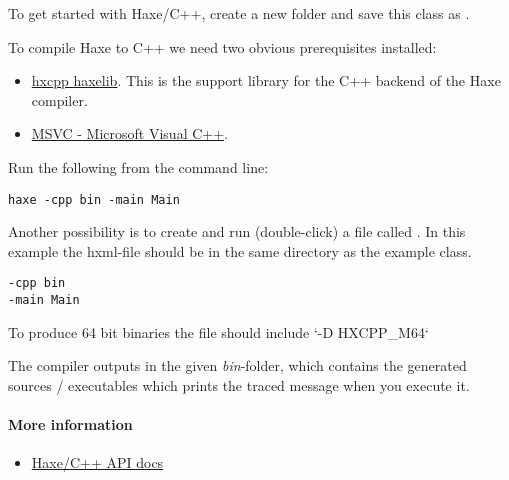 To get started with Haxe/C++, create a new folder and save this class as .


To compile Haxe to C++ we need two obvious prerequisites installed:

\begin{itemize}
	\item \href{http://lib.haxe.org/p/hxcpp}{hxcpp haxelib}. This is the support library for the C++ backend of the Haxe compiler.
	\item \href{http://www.microsoft.com/express/vc/}{MSVC - Microsoft Visual C++}.
\end{itemize}

Run the following from the command line:

\begin{lstlisting}
haxe -cpp bin -main Main
\end{lstlisting}

Another possibility is to create and run (double-click) a file called . In this example the hxml-file should be in the same directory as the example class.

\begin{lstlisting}
-cpp bin
-main Main
\end{lstlisting}

To produce 64 bit binaries the file should include `-D HXCPP_M64` 

The compiler outputs in the given \emph{bin}-folder, which contains the generated sources / executables which prints the traced message when you execute it. 

\paragraph{More information}

\begin{itemize}
	\item \href{http://api.haxe.org/cpp/}{Haxe/C++ API docs}
\end{itemize}

